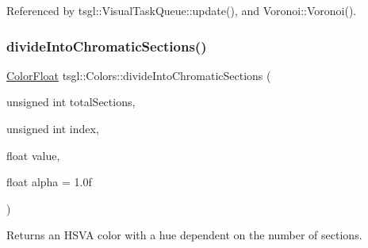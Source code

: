 Referenced by tsgl\+::\+Visual\+Task\+Queue\+::update(), and Voronoi\+::\+Voronoi().

\mbox{\label{classtsgl_1_1_colors_af610e20b5176294e24fdae4af4f5d6dc}} 
\subsubsection{\texorpdfstring{divide\+Into\+Chromatic\+Sections()}{divideIntoChromaticSections()}\hspace{0.1cm}{\footnotesize\ttfamily [1/2]}}
{\footnotesize\ttfamily \hyperlink{structtsgl_1_1_color_float}{Color\+Float} tsgl\+::\+Colors\+::divide\+Into\+Chromatic\+Sections (\begin{DoxyParamCaption}\item[{unsigned int}]{total\+Sections,  }\item[{unsigned int}]{index,  }\item[{float}]{value,  }\item[{float}]{alpha = {\ttfamily 1.0f} }\end{DoxyParamCaption})\hspace{0.3cm}{\ttfamily [static]}}



Returns an H\+S\+VA color with a hue dependent on the number of sections. 

